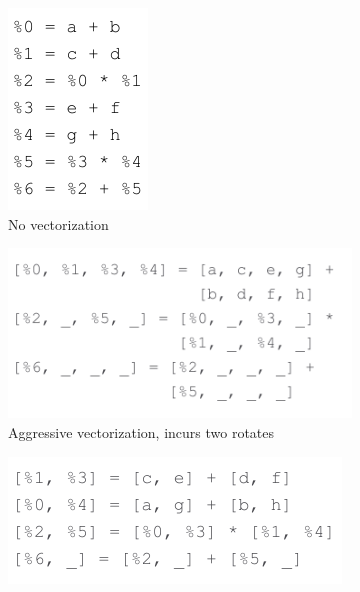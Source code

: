 \begin{figure}
\small
    \begin{subfigure}{0.35\columnwidth}
        \includegraphics[width=0.6\linewidth]{figures/possible_schedules/no_vectorization.drawio.pdf}
        \vspace{-1em}
        \caption{No vectorization}\label{fig:no-vectorization}
    \end{subfigure}
    \begin{subfigure}{0.6\columnwidth}
        \includegraphics[width=0.9\linewidth]{figures/possible_schedules/aggressive_vectorization.drawio.pdf}
        \vspace{-1em}        
        \caption{Aggressive vectorization, incurs two rotates}\label{fig:aggressive-vectorization}
    \end{subfigure}
    \begin{subfigure}{0.8\columnwidth}
        \centering
        \includegraphics[width=0.7\linewidth]{figures/possible_schedules/optimal_schedule.drawio.pdf}

\end{subfigure}
\end{figure}
